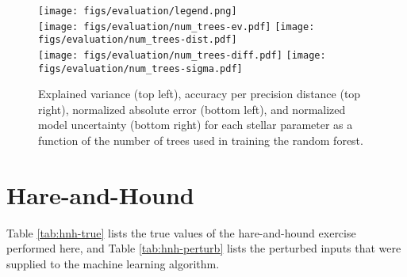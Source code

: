 \documentclass[twocolumn,twocolappendix]{aastex6}
\begin{document}
\begin{figure*}
    \centering
    \texttt{[image: figs/evaluation/legend.png]}\\
    \texttt{[image: figs/evaluation/num\_trees-ev.pdf]}%
    \texttt{[image: figs/evaluation/num\_trees-dist.pdf]}\\
    \texttt{[image: figs/evaluation/num\_trees-diff.pdf]}%
    \texttt{[image: figs/evaluation/num\_trees-sigma.pdf]}\\
    \caption{Explained variance (top left), accuracy per precision distance (top right), normalized absolute error (bottom left), and normalized model uncertainty (bottom right) for each stellar parameter as a function of the number of trees used in training the random forest. } 
    \label{fig:app-evaluation-trees}
\end{figure*}


\section{Hare-and-Hound}
\label{sec:hare-and-hound}
Table \ref{tab:hnh-true} lists the true values of the hare-and-hound exercise performed here, and Table \ref{tab:hnh-perturb} lists the perturbed inputs that were supplied to the machine learning algorithm. 
\end{document}
